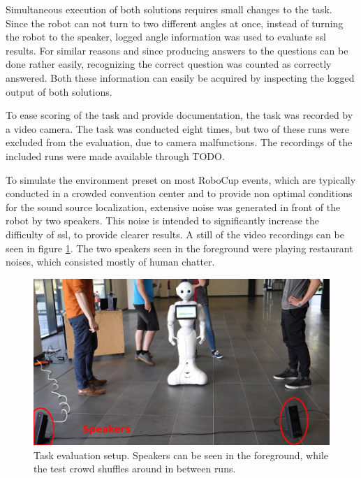 Simultaneous execution of both solutions requires small changes to the task.
Since the robot can not turn to two different angles at once, instead of turning the robot to the speaker, logged angle information was used to evaluate \gls{ssl} results.
For similar reasons and since producing answers to the questions can be done rather easily, recognizing the correct question was counted as correctly answered.
Both these information can easily be acquired by inspecting the logged output of both solutions.

To ease scoring of the task and provide documentation, the task was recorded by a video camera.
The task was conducted eight times, but two of these runs were excluded from the evaluation, due to camera malfunctions.
The recordings of the included runs were made available through TODO.

To simulate the environment preset on most RoboCup events, which are typically conducted in a crowded convention center and to provide non optimal conditions for the sound source localization, extensive noise was generated in front of the robot by two speakers.
This noise is intended to significantly increase the difficulty of \gls{ssl}, to provide clearer results.
A still of the video recordings can be seen in figure \ref{pic:eval_task_setup_pepper}.
The two speakers seen in the foreground were playing restaurant noises, which consisted mostly of human chatter.

\begin{figure}[]
	\centering
	\includegraphics[width=\textwidth]{bilder/eval/pepper_task_setup_small.jpg}
	\caption{Task evaluation setup. 
		Speakers can be seen in the foreground, while the test crowd shuffles around in between runs.}
	\label{pic:eval_task_setup_pepper}
\end{figure}

